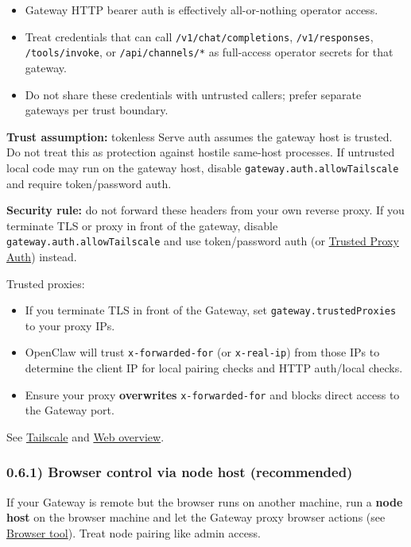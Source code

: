 \begin{itemize}
  \item Gateway HTTP bearer auth is effectively all-or-nothing operator access.
  \item Treat credentials that can call \texttt{/v1/chat/completions}, \texttt{/v1/responses}, \texttt{/tools/invoke}, or \texttt{/api/channels/*} as full-access operator secrets for that gateway.
  \item Do not share these credentials with untrusted callers; prefer separate gateways per trust boundary.
\end{itemize}


\textbf{Trust assumption:} tokenless Serve auth assumes the gateway host is trusted.
Do not treat this as protection against hostile same-host processes. If untrusted
local code may run on the gateway host, disable \texttt{gateway.auth.allowTailscale}
and require token/password auth.

\textbf{Security rule:} do not forward these headers from your own reverse proxy. If
you terminate TLS or proxy in front of the gateway, disable
\texttt{gateway.auth.allowTailscale} and use token/password auth (or \href{/gateway/trusted-proxy-auth}{Trusted Proxy Auth}) instead.

Trusted proxies:

\begin{itemize}
  \item If you terminate TLS in front of the Gateway, set \texttt{gateway.trustedProxies} to your proxy IPs.
  \item OpenClaw will trust \texttt{x-forwarded-for} (or \texttt{x-real-ip}) from those IPs to determine the client IP for local pairing checks and HTTP auth/local checks.
  \item Ensure your proxy \textbf{overwrites} \texttt{x-forwarded-for} and blocks direct access to the Gateway port.
\end{itemize}


See \href{/gateway/tailscale}{Tailscale} and \href{/web}{Web overview}.

\subsubsection{0.6.1) Browser control via node host (recommended)}


If your Gateway is remote but the browser runs on another machine, run a \textbf{node host}
on the browser machine and let the Gateway proxy browser actions (see \href{/tools/browser}{Browser tool}).
Treat node pairing like admin access.

